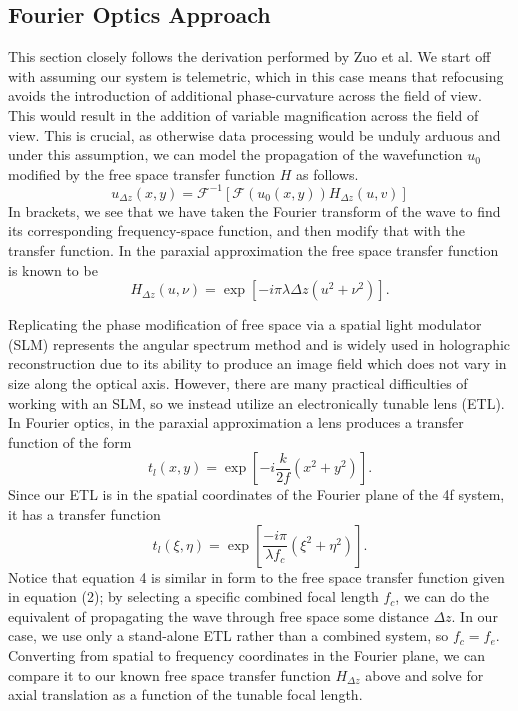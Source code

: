 \subsection{Fourier Optics Approach}
This section closely follows the derivation performed by Zuo et al. \cite{Zuo} We start off with assuming our system is telemetric, which in this case means that refocusing avoids the introduction of additional phase-curvature across the field of view. This would result in the addition of variable magnification across the field of view. This is crucial, as otherwise data processing would be unduly arduous and under this assumption, we can model the propagation of the wavefunction $u_0$ modified by the free space transfer function $H$ as follows. 
\begin{equation}
	u_{\Delta z}(x,y) = \mathcal{F}^{-1}\left[ \mathcal{F}(u_0(x,y))H_{\Delta z}(u,v)\right]
\end{equation}
In brackets, we see that we have taken the Fourier transform of the wave to find its corresponding frequency-space function, and then modify that with the transfer function. In the paraxial approximation the free space transfer function is known to be
\begin{equation}
	H_{\Delta z}(u,\nu) = \exp\left[-i \pi \lambda \Delta z (u^2 + \nu^2)\right].
\end{equation}
\par Replicating the phase modification of free space via a spatial light modulator (SLM) represents the angular spectrum method and is widely used in holographic reconstruction due to its ability to produce an image field which does not vary in size along the optical axis. However, there are many practical difficulties of working with an SLM, so we instead utilize an electronically tunable lens (ETL). In Fourier optics, in the paraxial approximation a lens produces a transfer function of the form \cite{Goodman}
\begin{equation}
	t_l(x,y) =\exp \left[ - i \frac{k}{2f}\left(x^2 + y^2\right)\right].
\end{equation}
Since our ETL is in the spatial coordinates of the Fourier plane of the 4f system, it has a transfer function
\begin{equation}
	t_l(\xi, \eta) = \exp\left[ \frac{-i \pi}{\lambda f_c}\left(\xi^2 + \eta^2\right)\right].
\end{equation}
Notice that equation 4 is similar in form to the free space transfer function given in equation (2); by selecting a specific combined focal length $f_c$, we can do the equivalent of propagating the wave through free space some distance $\Delta z$. In our case, we use only a stand-alone ETL rather than a combined system, so $f_c = f_e.$ Converting from  spatial to frequency coordinates in the Fourier plane,  we can compare it to our known free space transfer function $H_{\Delta z}$ above and solve for axial translation as a function of the tunable focal length.
